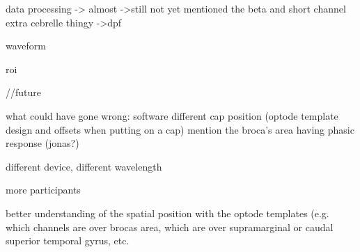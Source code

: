 data processing
-> almost
->still not yet mentioned the beta and short channel extra cebrelle thingy
->dpf

waveform 

roi

//future

what could have gone wrong:
software different
cap position (optode template design and offsets when putting on a cap) mention the broca's area having phasic response (jonas?)

different device, different wavelength

more participants

better understanding of the spatial position with the optode templates (e.g. which channels are over brocas area, which are over supramarginal or caudal superior temporal gyrus, etc.